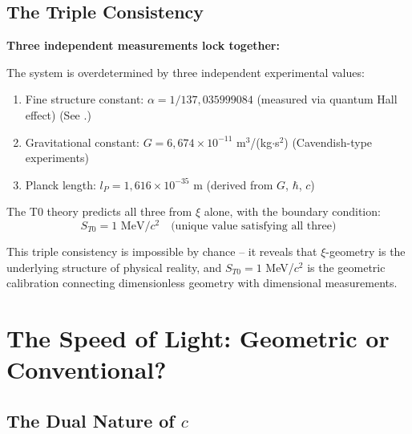 	\subsection{The Triple Consistency}
	
	\begin{insight}
		\textbf{Three independent measurements lock together:}
		
		The system is overdetermined by three independent experimental values:
		\begin{enumerate}
			\item Fine structure constant: $\alpha = 1/137{,}035999084$ (measured via quantum Hall effect) (See \cite{fine_structure_constant_En}.)
			\item Gravitational constant: $G = 6{,}674 \times 10^{-11}$ m$^3$/(kg$\cdot$s$^2$) (Cavendish-type experiments)
			\item Planck length: $l_P = 1{,}616 \times 10^{-35}$ m (derived from $G$, $\hbar$, $c$)
		\end{enumerate}
		
		The T0 theory predicts all three from $\xi$ alone, with the boundary condition:
		\begin{equation}
			S_{T0} = 1 \text{ MeV}/c^2 \quad \text{(unique value satisfying all three)}
		\end{equation}
		
		This triple consistency is impossible by chance -- it reveals that $\xi$-geometry is the underlying structure of physical reality, and $S_{T0} = 1$ MeV/$c^2$ is the geometric calibration connecting dimensionless geometry with dimensional measurements.
	\end{insight}
	
	\section{The Speed of Light: Geometric or Conventional?}
	
	\subsection{The Dual Nature of $c$}
	
